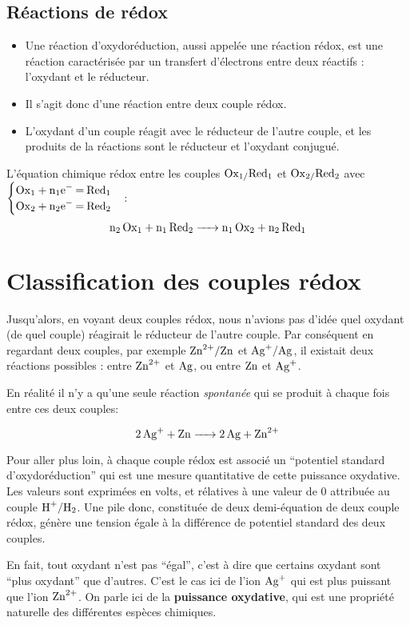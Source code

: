 \documentclass[11pt,a4paper]{article}
\begin{document}
\subsection*{Réactions de rédox}
\begin{itemize}
    \item Une réaction d’oxydoréduction, aussi appelée une réaction rédox, est une réaction caractérisée par un transfert d’électrons entre deux réactifs : l’oxydant et le réducteur.  
    \item Il s’agit donc d’une réaction entre deux couple rédox.
    \item L’oxydant d’un couple réagit avec le réducteur de l’autre couple, et les produits de la réactions sont le réducteur et l’oxydant conjugué.
\end{itemize}

L’équation chimique rédox entre les couples $\ce{Ox_1/Red_1}$ et $\ce{Ox_2/Red_2}$ avec 
$\begin{cases}       
\ce{Ox_1 + n1e- = Red_1}\\
\ce{Ox_2 + n2e- = Red_2}
\end{cases}$:
\[\ce{n2 Ox1 + n1 Red2 -> n1 Ox2 + n2 Red1}\]

\section{Classification des couples rédox}
Jusqu'alors, en voyant deux couples rédox, nous n'avions pas d'idée quel oxydant (de quel couple) réagirait le réducteur de l'autre couple.  Par conséquent en regardant deux couples, par exemple $\couple{Zn^2+}{Zn}$ et $\couple{Ag+}{Ag}$, il existait deux réactions possibles : entre $\ce{Zn^2+}$ et $\ce{Ag}$, ou entre $\ce{Zn}$ et $\ce{Ag+}$. 

En réalité il n'y a qu'une seule réaction \textit{spontanée} qui se produit à chaque fois entre ces deux couples: 

\[ \ce{2Ag+ + Zn -> 2 Ag + Zn^2+} \]

\begin{wraptable}[11]{r}{0.4\linewidth} 
\begin{rmrq} 
\small{Pour aller plus loin, à chaque couple rédox est associé un ``potentiel standard d'oxydoréduction'' qui est une mesure quantitative de cette puissance oxydative. Les valeurs sont exprimées en volts, et rélatives à une valeur de $0$ attribuée au couple $\couple{H+}{H2}$. Une pile donc, constituée de deux demi-équation de deux couple rédox, génère une tension égale à la différence de potentiel standard des deux couples. } 
\end{rmrq} 
\end{wraptable}
En fait, tout oxydant n'est pas ``égal'', c'est à dire que certains oxydant sont ``plus oxydant'' que d'autres. C'est le cas ici de l'ion $\ce{Ag+}$ qui est plus puissant que l'ion $\ce{Zn^2+}$. On parle ici de la \textbf{puissance oxydative}, qui est une propriété naturelle des différentes espèces chimiques. 
\end{document}
